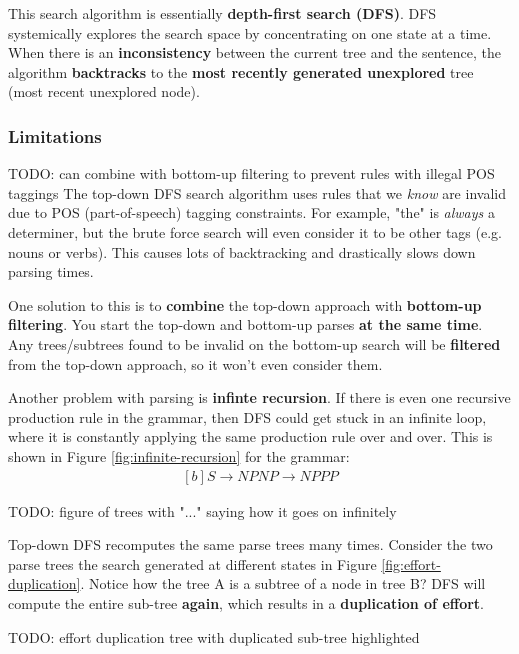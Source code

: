 \documentclass{article}
\begin{document}
This search algorithm is essentially \textbf{depth-first search (DFS)}. DFS systemically explores the search space by concentrating on one state at a time. When there is an \textbf{inconsistency} between the current tree and the sentence, the algorithm \textbf{backtracks} to the \textbf{most recently generated unexplored} tree (most recent unexplored node).

\subsubsection{Limitations}

TODO: can combine with bottom-up filtering to prevent rules with illegal POS taggings
The top-down DFS search algorithm uses rules that we \textit{know} are invalid due to POS (part-of-speech) tagging constraints. For example, "the" is \textit{always} a determiner, but the brute force search will even consider it to be other tags (e.g. nouns or verbs). This causes lots of backtracking and drastically slows down parsing times.

One solution to this is to \textbf{combine} the top-down approach with \textbf{bottom-up filtering}. You start the top-down and bottom-up parses \textbf{at the same time}. Any trees/subtrees found to be invalid on the bottom-up search will be \textbf{filtered} from the top-down approach, so it won't even consider them.

Another problem with parsing is \textbf{infinte recursion}. If there is even one recursive production rule in the grammar, then DFS could get stuck in an infinite loop, where it is constantly applying the same production rule over and over. This is shown in Figure \ref{fig:infinite-recursion} for the grammar:
\begin{equation}
\begin{aligned}[b]
S \rightarrow NP
NP \rightarrow NP PP
\end{aligned}
\end{equation}

TODO: figure of trees with "..." saying how it goes on infinitely

Top-down DFS recomputes the same parse trees many times. Consider the two parse trees the search generated at different states in Figure \ref{fig:effort-duplication}. Notice how the tree A is a subtree of a node in tree B? DFS will compute the entire sub-tree \textbf{again}, which results in a \textbf{duplication of effort}.

TODO: effort duplication tree with duplicated sub-tree highlighted
\end{document}
